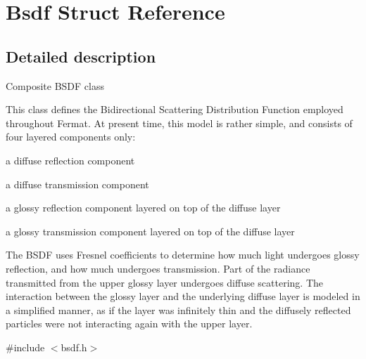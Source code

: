\hypertarget{struct_bsdf}{}\section{Bsdf Struct Reference}
\label{struct_bsdf}


\subsection{Detailed description}
Composite B\+S\+DF class \begin{DoxyParagraph}{}
This class defines the Bidirectional Scattering Distribution Function employed throughout Fermat. At present time, this model is rather simple, and consists of four layered components only\+: 
\end{DoxyParagraph}
\begin{DoxyParagraph}{}

\begin{DoxyItemize}
\item a diffuse reflection component
\item a diffuse transmission component
\item a glossy reflection component layered on top of the diffuse layer
\item a glossy transmission component layered on top of the diffuse layer 
\end{DoxyItemize}
\end{DoxyParagraph}
\begin{DoxyParagraph}{}
The B\+S\+DF uses Fresnel coefficients to determine how much light undergoes glossy reflection, and how much undergoes transmission. Part of the radiance transmitted from the upper glossy layer undergoes diffuse scattering. The interaction between the glossy layer and the underlying diffuse layer is modeled in a simplified manner, as if the layer was infinitely thin and the diffusely reflected particles were not interacting again with the upper layer. 
\end{DoxyParagraph}


{\ttfamily \#include $<$bsdf.\+h$>$}

